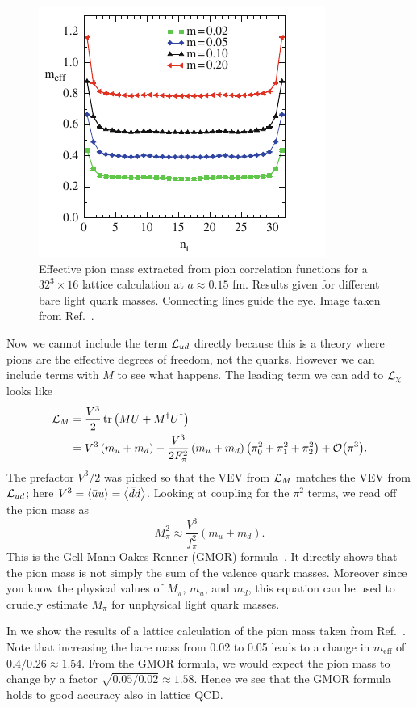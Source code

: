 \begin{figure}
\centering
\includegraphics[width=0.5\linewidth]{figs/GMOR.pdf}
\caption{Effective pion mass extracted from pion correlation functions
for a $32^3\times16$ lattice calculation at $a\approx0.15$ fm.
Results given for different bare light quark masses. Connecting lines guide the
eye. Image taken from Ref.~\cite{gattringer_quantum_2010}.}
\label{fig:GMOR}
\end{figure}

Now we cannot include the term $\mathcal{L}_{ud}$ directly because this is a theory
where pions are the effective degrees of freedom, not the quarks. However we can
include terms with $M$ to see what happens. The leading term we can add to
$\mathcal{L}_\chi$ looks like
\begin{equation}
\begin{aligned}
\Lagr_M & =\frac{V^3}{2} \operatorname{tr}\left(M U+M^{\dagger} U^{\dagger}\right) \\
& =V^3\left(m_u+m_d\right)-\frac{V^3}{2
F_\pi^2}\left(m_u+m_d\right)\left(\pi_0^2+\pi_1^2+\pi_2^2\right)+\order{\pi^3} .
\end{aligned}
\end{equation}
The prefactor $V^3/2$ was picked so that the VEV from $\mathcal{L}_M$ matches the VEV
from $\mathcal{L}_{ud}$; here $V^3=\ev{\bar{u}u}=\ev{\bar{d}d}$. Looking at coupling
for the $\pi^2$ terms, we read off the pion mass as
\begin{equation}
  M_\pi^2\approx \frac{V^3}{f_\pi^2}(m_u+m_d).
\end{equation}
This is the Gell-Mann-Oakes-Renner (GMOR)
formula~\cite{gell-mann_behavior_1968}.
It directly shows that the pion mass is not simply the sum of
the valence quark masses. Moreover since you know the physical values
of $M_\pi$, $m_u$, and $m_d$, this equation can be used to crudely estimate
$M_\pi$ for unphysical light quark masses.

In  we show the results of a lattice calculation of the pion
mass taken from Ref.~\cite{gattringer_quantum_2010}. Note that increasing the
bare mass from 0.02 to 0.05 leads to a change in $m_\text{eff}$ of
$0.4/0.26\approx1.54$. From the GMOR formula, we would expect the pion mass to
change by a factor $\sqrt{0.05/0.02}\approx1.58$. Hence we see that the GMOR
formula holds to good accuracy also in lattice QCD.

